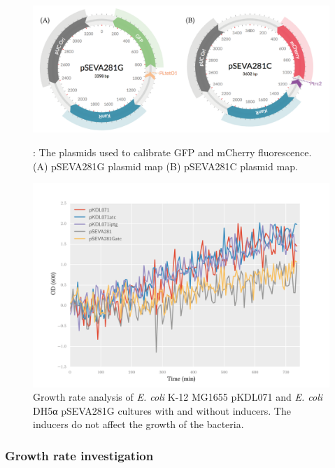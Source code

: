 \begin{figure}[p]
	\centerfloat
		\includegraphics[width=\textwidth]{../../chapters/chapterABCFlow/images/plasmids_constructed.png}
		\caption[pSEVA281G and pSEVA281C plasmid map]{\label{fig:psevas}: The plasmids used to calibrate GFP and mCherry fluorescence. (A) pSEVA281G plasmid map (B) pSEVA281C plasmid map.  }


		\includegraphics[scale=0.6]{../../chapters/chapterABCFlow/images/growth_curves.png}
		\caption[Growth rate curves of cultures with and without inducers]{\label{fig:growth_curve} Growth rate analysis of \textit{E. coli} K-12 MG1655 pKDL071 and \textit{E. coli} DH5α pSEVA281G cultures with and without inducers. The inducers do not affect the growth of the bacteria. }
\end{figure}

\subsubsection{Growth rate investigation}

